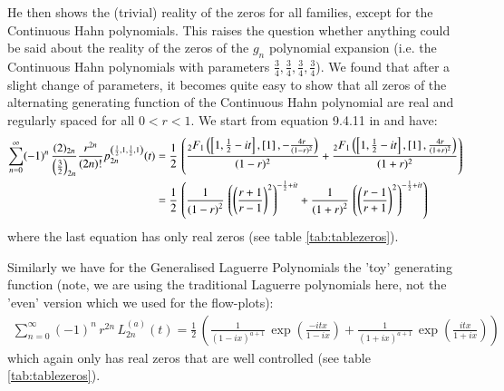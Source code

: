 \documentclass[a4paper,11pt,twoside]{amsart}
\newcommand{\verifiedeq}{=}
\newcommand{\verifiedeq}{\stackrel{\checkmark}{=}}
\begin{document}
He then shows the (trivial) reality of the zeros for all families, except for the Continuous Hahn polynomials. This raises the question whether anything could be said about the reality of the zeros of the $g_n$ polynomial expansion (i.e. the Continuous Hahn polynomials with parameters $\frac34, \frac34, \frac34, \frac34$). We found that after a slight change of parameters, it becomes quite easy to show that all zeros of the alternating generating function of the Continuous Hahn polynomial are real and regularly spaced for all $0 < r < 1$. We start from equation 9.4.11 in \cite{koe} and have:
\begin{align}
\sum_{n=0}^\infty (-1)^n\, \frac{(2)_{2n}}{\left(\frac32\right)_{2n}}\frac{ r^{2n}}{(2n)!}p_{2n}^{\left(\frac12,1,\frac12,1\right)}(t) &\verifiedeq \frac12\,\left(\frac{{}_2F_1\left(\left[1,\frac12-it\right],\left[1\right], -\frac{4r}{(1-r)^2}\right)}{(1-r)^2}+\frac{{}_2F_1\left(\left[1,\frac12-it\right],\left[1\right], \frac{4r}{(1+r)^2}\right)}{(1+r)^2} \right) \\
 & \verifiedeq \frac12\, \left(\frac{1}{\left(1-r \right)^{2}}\,\left(\left(\dfrac{r+1}{r -1}\right)^{2}\right)^{-\frac{1}{2}+it}+\frac{1}{{\left(1+r \right)^{2}}}\,\left(\left(\dfrac{r -1}{r+1}\right)^{2}\right)^{-\frac{1}{2}+it}\right) \notag
\end{align}
where the last equation has only real zeros (see table \ref{tab:tablezeros}).

Similarly we have for the Generalised Laguerre Polynomials the 'toy' generating function (note, we are using the traditional Laguerre polynomials here, not the 'even' version which we used for the flow-plots):
\begin{align}
\sum_{n=0}^\infty (-1)^n\,r^{2n} \,L_{2n}^{\left(a\right)}(t) \verifiedeq \frac12\,\left(\frac{1}{(1-ix)^{a+1}}\,\displaystyle \exp\left(\frac{-itx}{1-ix}\right)+\frac{1}{(1+ix)^{a+1}}\, \exp\left(\frac{itx}{1+ix}\right)\right)
\end{align}
which again only has real zeros that are well controlled (see table \ref{tab:tablezeros}).
\end{document}
